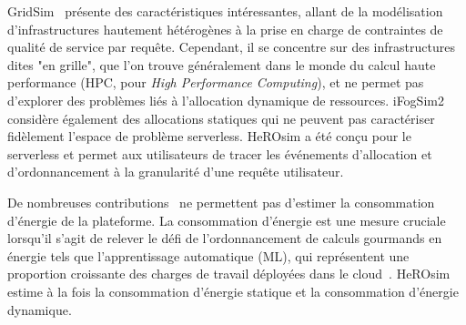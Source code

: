 

GridSim~\cite{buyyaGridSimToolkitModeling2002} présente des caractéristiques intéressantes, allant de la modélisation d'infrastructures hautement hétérogènes à la prise en charge de contraintes de qualité de service par requête. Cependant, il se concentre sur des infrastructures dites "en grille", que l'on trouve généralement dans le monde du calcul haute performance (\gls{HPC}, pour \textit{High Performance Computing}), et ne permet pas d'explorer des problèmes liés à l'allocation dynamique de ressources. iFogSim2~\cite{mahmudIFogSim2ExtendedIFogSim2021} considère également des allocations statiques qui ne peuvent pas caractériser fidèlement l'espace de problème serverless.
HeROsim a été conçu pour le serverless et permet aux utilisateurs de tracer les événements d'allocation et d'ordonnancement à la granularité d'une requête utilisateur.

De nombreuses contributions~\cite{jeonCloudSimExtensionSimulatingDistributed2019, cai_elasticsim_2017, buyyaGridSimToolkitModeling2002, nunez_icancloud_2012} ne permettent pas d'estimer la consommation d'énergie de la plateforme. La consommation d'énergie est une mesure cruciale lorsqu'il s'agit de relever le défi de l'ordonnancement de calculs gourmands en énergie tels que l'apprentissage automatique (\gls{ML}), qui représentent une proportion croissante des charges de travail déployées dans le cloud~\cite{masanetRecalibratingGlobalData2020}.
HeROsim estime à la fois la consommation d'énergie statique et la consommation d'énergie dynamique.

